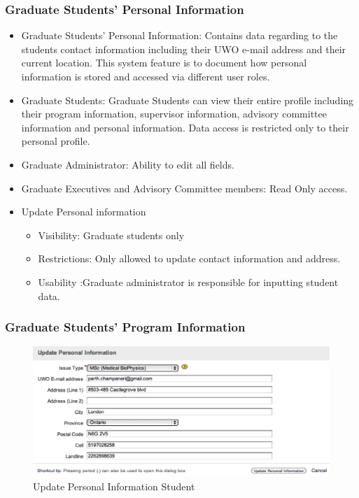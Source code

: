\documentclass[11pt,a4paper]{report}
\begin{document}
\subsubsection{ Graduate Students’ Personal Information }
\begin{itemize}
\item Graduate Students’ Personal Information:
Contains data regarding to the students contact information including their UWO e-mail address and their current location. This system feature is to document how personal information is stored and accessed via different user roles. 
\item Graduate Students: Graduate Students can view their entire profile including their program information, supervisor information, advisory committee information and personal information. Data access is restricted only to their personal profile.
\item Graduate Administrator: Ability to edit all fields.
\item Graduate Executives and Advisory Committee members: Read Only access.
\item Update Personal information
\begin{itemize}
\item Visibility: Graduate students only
\item Restrictions: Only allowed to update contact information and address. 
\item Usability :Graduate administrator is responsible for inputting student data.
\end{itemize}
\end{itemize}
\subsubsection{ Graduate Students’ Program Information }

\begin{figure}[htp]
\centering
\includegraphics[scale=1]{diagrams/HTMLTemplating/UpdatePersonalInfoStudent.png}
\caption{Update Personal Information Student}
\label{fig:UpdatePIS}
\end{figure}
\end{document}
